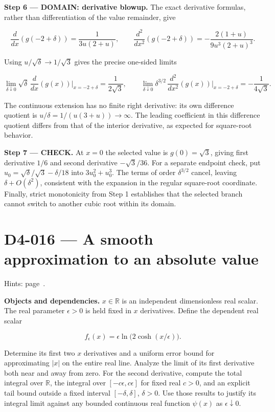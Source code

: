 \documentclass[11pt,oneside,openany]{book}
\begin{document}
\begin{DomainStep}
\textbf{Step 6 --- DOMAIN: derivative blowup.} The exact derivative formulas, rather than differentiation of the value remainder, give

\[
\frac{d}{dx}\left(g(-2+\delta)\right)=\frac1{3u(2+u)},
\qquad
\frac{d^2}{dx^2}\left(g(-2+\delta)\right)
=-\frac{2(1+u)}{9u^3(2+u)^3}.
\]

Using \(u/\sqrt\delta\to1/\sqrt3\) gives the precise one-sided limits

\[
\lim_{\delta\downarrow0}\sqrt\delta\,\frac{d}{dx}\left(g(x)\right)\bigg|_{x=-2+\delta}
=\frac1{2\sqrt3},
\qquad
\lim_{\delta\downarrow0}\delta^{3/2}\,\frac{d^2}{dx^2}\left(g(x)\right)\bigg|_{x=-2+\delta}
=-\frac1{4\sqrt3}.
\]

The continuous extension has no finite right derivative: its own difference quotient is \(u/\delta=1/(u(3+u))\to\infty\). The leading coefficient in this difference quotient differs from that of the interior derivative, as expected for square-root behavior.

\end{DomainStep}
\textbf{Step 7 --- CHECK.} At \(x=0\) the selected value is \(g(0)=\sqrt3\), giving first derivative \(1/6\) and second derivative \(-\sqrt3/36\). For a separate endpoint check, put \(u_0=\sqrt\delta/\sqrt3-\delta/18\) into \(3u_0^2+u_0^3\). The terms of order \(\delta^{3/2}\) cancel, leaving \(\delta+O(\delta^2)\), consistent with the expansion in the regular square-root coordinate. Finally, strict monotonicity from Step 1 establishes that the selected branch cannot switch to another cubic root within its domain.
\clearpage
\section{D4-016 --- A smooth approximation to an absolute value}
\label{problem:D4-016}
{\small Hints: page~\pageref{hints:D4-016}.}\par\medskip

\textbf{Objects and dependencies.} \(x\in\mathbb R\) is an independent dimensionless real scalar. The real parameter \(\epsilon>0\) is held fixed in \(x\) derivatives. Define the dependent real scalar

\[
f_\epsilon(x)=\epsilon\ln\bigl(2\cosh(x/\epsilon)\bigr).
\]

Determine its first two \(x\) derivatives and a uniform error bound for approximating \(|x|\) on the entire real line. Analyze the limit of its first derivative both near and away from zero. For the second derivative, compute the total integral over \(\mathbb R\), the integral over \([-c\epsilon,c\epsilon]\) for fixed real \(c>0\), and an explicit tail bound outside a fixed interval \([-\delta,\delta]\), \(\delta>0\). Use those results to justify its integral limit against any bounded continuous real function \(\psi(x)\) as \(\epsilon\downarrow0\).
\end{document}
